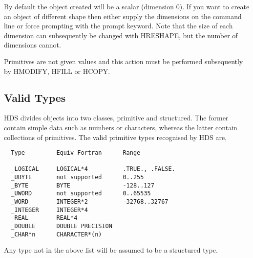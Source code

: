 \documentclass{book}
\renewcommand{\_}{{\tt\char'137}}     %
\begin{document}
By default the object created will be a scalar (dimension 0). If
you want to create an object of different shape then either
supply the dimensions on the command line or force prompting with
the prompt keyword. Note that the size of each dimension can
subsequently be changed with HRESHAPE, but the number of
dimensions cannot.
 
Primitives are not given values and this action must be
performed subsequently by HMODIFY, HFILL or HCOPY.
 
\subsection{Valid Types}
HDS divides objects into two classes, primitive and structured.
The former contain simple data such as numbers or characters,
whereas the latter contain collections of primitives. The valid
primitive types recognised by HDS are,
 
\begin{verbatim}
  Type         Equiv Fortran      Range
 
  _LOGICAL     LOGICAL*4          .TRUE., .FALSE.
  _UBYTE       not supported      0..255
  _BYTE        BYTE               -128..127
  _UWORD       not supported      0..65535
  _WORD        INTEGER*2          -32768..32767
  _INTEGER     INTEGER*4
  _REAL        REAL*4
  _DOUBLE      DOUBLE PRECISION
  _CHAR*n      CHARACTER*(n)
\end{verbatim}
Any type not in the above list will be assumed to be a structured
type.
 
\end{document}
